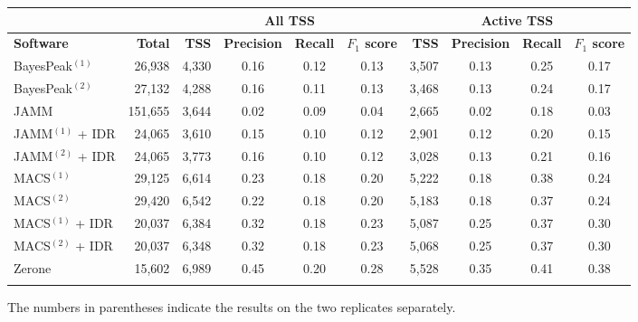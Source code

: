 \documentclass{bioinfo}
\begin{document}
\begin{table}[!t]
{\begin{tabular}{lr|rccc|rccc}
        \multicolumn{2}{c}{} & \multicolumn{4}{c}{\textbf{All TSS}} & \multicolumn{4}{c}{\textbf{Active TSS}} \\
        \midrule
        \textbf{Software} & \textbf{Total} &
        \textbf{TSS} & \textbf{Precision} & \textbf{Recall} & \textbf{$F_{1}$ score} &
        \textbf{TSS} & \textbf{Precision} & \textbf{Recall} & \textbf{$F_{1}$ score} \\
        \midrule
        BayesPeak$^{(1)}$  &  26,938 & 4,330 & 0.16 & 0.12 & 0.13 & 3,507 & 0.13 & 0.25 & 0.17 \\
        BayesPeak$^{(2)}$  &  27,132 & 4,288 & 0.16 & 0.11 & 0.13 & 3,468 & 0.13 & 0.24 & 0.17 \\
        JAMM               & 151,655 & 3,644 & 0.02 & 0.09 & 0.04 & 2,665 & 0.02 & 0.18 & 0.03 \\
        JAMM$^{(1)}$ + IDR &  24,065 & 3,610 & 0.15 & 0.10 & 0.12 & 2,901 & 0.12 & 0.20 & 0.15 \\
        JAMM$^{(2)}$ + IDR &  24,065 & 3,773 & 0.16 & 0.10 & 0.12 & 3,028 & 0.13 & 0.21 & 0.16 \\
        MACS$^{(1)}$       &  29,125 & 6,614 & 0.23 & 0.18 & 0.20 & 5,222 & 0.18 & 0.38 & 0.24 \\
        MACS$^{(2)}$       &  29,420 & 6,542 & 0.22 & 0.18 & 0.20 & 5,183 & 0.18 & 0.37 & 0.24 \\
        MACS$^{(1)}$ + IDR &  20,037 & 6,384 & 0.32 & 0.18 & 0.23 & 5,087 & 0.25 & 0.37 & 0.30 \\
        MACS$^{(2)}$ + IDR &  20,037 & 6,348 & 0.32 & 0.18 & 0.23 & 5,068 & 0.25 & 0.37 & 0.30 \\
        Zerone             &  15,602 & 6,989 & 0.45 & 0.20 & 0.28 & 5,528 & 0.35 & 0.41 & 0.38 \\
        \botrule
\end{tabular}}{The numbers in parentheses indicate the results on the two
replicates separately.}
\end{table}
\end{document}
